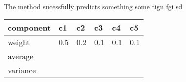 The method sucessfully predicts something some tign fgi sd
\begin{table}
\centering
\begin{tabular}{|l|l|l|l|l|l|} 
\hline
component & c1 & c2 & c3 & c4 & c5 \\ 
\hline
weight & 0.5 & 0.2 & 0.1 & 0.1 & 0.1 \\ 
\hline
average &  &  &  &  &   \\
\hline
variance &  &  &  &  &   \\
\hline
\end{tabular}
\end{table}

